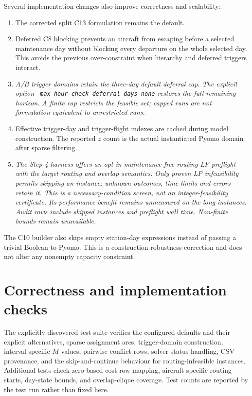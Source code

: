 Several implementation changes also improve correctness and scalability:
\begin{enumerate}
    \item The corrected split C13 formulation remains the default.
    \item Deferred C8 blocking prevents an aircraft from escaping before a
    selected maintenance day without blocking every departure on the whole
    selected day. This avoids the previous over-constraint when hierarchy and
    deferred triggers interact.
    \item \textit{A/B trigger domains retain the three-day default deferral
    cap. The explicit option \texttt{--max-hour-check-deferral-days none}
    restores the full remaining horizon. A finite cap restricts the feasible
    set; capped runs are not formulation-equivalent to unrestricted runs.}
    \item Effective trigger-day and trigger-flight indexes are cached during
    model construction. The reported $z$ count is the actual instantiated
    Pyomo domain after sparse filtering.
    \item \textit{The Step 4 harness offers an opt-in maintenance-free routing
    LP preflight with the target routing and overlap semantics. Only proven
    LP infeasibility permits skipping an instance; unknown outcomes, time
    limits and errors retain it. This is a necessary-condition screen, not an
    integer-feasibility certificate. Its performance benefit remains unmeasured
    on the long instances. Audit rows include skipped instances and preflight
    wall time. Non-finite bounds remain unavailable.}
\end{enumerate}

The C10 builder also skips empty station-day expressions instead of passing a
trivial Boolean to Pyomo. This is a construction-robustness correction and does
not alter any nonempty capacity constraint.

\section{Correctness and implementation checks}

The explicitly discovered test suite verifies the configured defaults and
their explicit alternatives, sparse assignment arcs, trigger-domain
construction, interval-specific $M$ values, pairwise conflict rows,
solver-status handling, CSV provenance, and the skip-and-continue behaviour
for routing-infeasible instances. Additional tests check zero-based cost-row
mapping, aircraft-specific routing starts, day-state bounds, and overlap-clique
coverage. Test counts are reported by the test run rather than fixed here.

